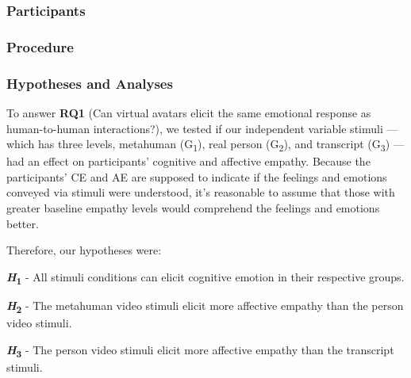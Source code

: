 \subsubsection{Participants}


\subsubsection{Procedure}


\subsubsection{Hypotheses and Analyses}
To answer \textbf{RQ1} (Can virtual avatars elicit the same emotional response as human-to-human interactions?), we tested if our independent variable stimuli --- which has three levels, metahuman (G\textsubscript{1}), real person (G\textsubscript{2}), and transcript (G\textsubscript{3}) --- had an effect on participants' cognitive and affective empathy. Because the participants' CE and AE are supposed to indicate if the feelings and emotions conveyed via stimuli were understood, it's reasonable to assume that those with greater baseline empathy levels would comprehend the feelings and emotions better.

Therefore, our hypotheses were:

\textbf{\textit{H}\textsubscript{1}} - All stimuli conditions can elicit cognitive emotion in their respective groups.

\textbf{\textit{H}\textsubscript{2}} - The metahuman video stimuli elicit more affective empathy than the person video stimuli.

\textbf{\textit{H}\textsubscript{3}} - The person video stimuli elicit more affective empathy than the transcript stimuli.


